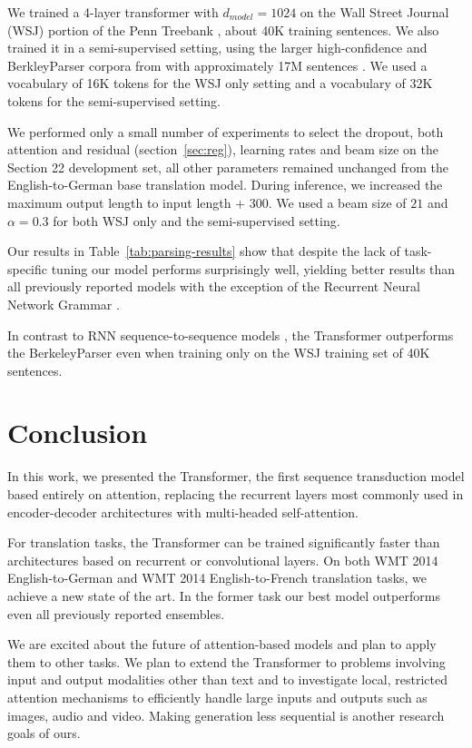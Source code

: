 We trained a 4-layer transformer with $d_{model} = 1024$ on the Wall Street Journal (WSJ) portion of the Penn Treebank \citep{marcus1993building}, about 40K training sentences. We also trained it in a semi-supervised setting, using the larger high-confidence and BerkleyParser corpora from with approximately 17M sentences \citep{KVparse15}. We used a vocabulary of 16K tokens for the WSJ only setting and a vocabulary of 32K tokens for the semi-supervised setting.

We performed only a small number of experiments to select the dropout, both attention and residual (section~\ref{sec:reg}), learning rates and beam size on the Section 22 development set, all other parameters remained unchanged from the English-to-German base translation model. During inference, we increased the maximum output length to input length + $300$. We used a beam size of $21$ and $\alpha=0.3$ for both WSJ only and the semi-supervised setting.

Our results in Table~\ref{tab:parsing-results} show that despite the lack of task-specific tuning our model performs surprisingly well, yielding better results than all previously reported models with the exception of the Recurrent Neural Network Grammar \cite{dyer-rnng:16}.

In contrast to RNN sequence-to-sequence models \citep{KVparse15}, the Transformer outperforms the BerkeleyParser \cite{petrov-EtAl:2006:ACL} even when training only on the WSJ training set of 40K sentences.


\section{Conclusion}
In this work, we presented the Transformer, the first sequence transduction model based entirely on attention, replacing the recurrent layers most commonly used in encoder-decoder architectures with multi-headed self-attention.

For translation tasks, the Transformer can be trained significantly faster than architectures based on recurrent or convolutional layers. On both WMT 2014 English-to-German and WMT 2014 English-to-French translation tasks, we achieve a new state of the art. In the former task our best model outperforms even all previously reported ensembles.

We are excited about the future of attention-based models and plan to apply them to other tasks. We plan to extend the Transformer to problems involving input and output modalities other than text and to investigate local, restricted attention mechanisms to efficiently handle large inputs and outputs such as images, audio and video.
Making generation less sequential is another research goals of ours.


